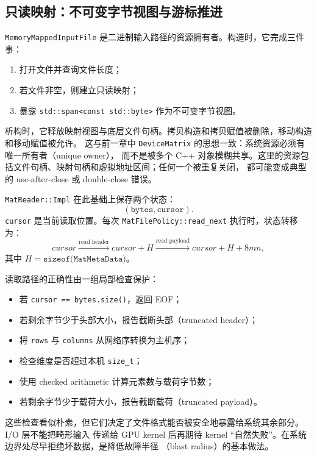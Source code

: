 \subsection{只读映射：不可变字节视图与游标推进}

\texttt{MemoryMappedInputFile} 是二进制输入路径的资源拥有者。构造时，它完成三件事：

\begin{enumerate}
    \item 打开文件并查询文件长度；
    \item 若文件非空，则建立只读映射；
    \item 暴露 \texttt{std::span<const std::byte>} 作为不可变字节视图。
\end{enumerate}

析构时，它释放映射视图与底层文件句柄。拷贝构造和拷贝赋值被删除，移动构造和移动赋值被允许。
这与前一章中 \texttt{DeviceMatrix} 的思想一致：系统资源必须有唯一所有者（unique owner），
而不是被多个 C++ 对象模糊共享。这里的资源包括文件句柄、映射句柄和虚拟地址区间；任何一个被重复关闭，
都可能变成典型的 use-after-close 或 double-close 错误。

\texttt{MatReader::Impl} 在此基础上保存两个状态：
\[
    (\texttt{bytes},\texttt{cursor}).
\]
\texttt{cursor} 是当前读取位置。每次 \texttt{MatFilePolicy::read\_next} 执行时，状态转移为：
\[
    cursor
    \xrightarrow{\text{read header}}
    cursor + H
    \xrightarrow{\text{read payload}}
    cursor + H + 8mn,
\]
其中 $H=\texttt{sizeof(MatMetaData)}$。

读取路径的正确性由一组局部检查保护：

\begin{itemize}
    \item 若 \texttt{cursor == bytes.size()}，返回 EOF；
    \item 若剩余字节少于头部大小，报告截断头部（truncated header）；
    \item 将 \texttt{rows} 与 \texttt{columns} 从网络序转换为主机序；
    \item 检查维度是否超过本机 \texttt{size\_t}；
    \item 使用 checked arithmetic 计算元素数与载荷字节数；
    \item 若剩余字节少于载荷大小，报告截断载荷（truncated payload）。
\end{itemize}

这些检查看似朴素，但它们决定了文件格式能否被安全地暴露给系统其余部分。I/O 层不能把畸形输入
传递给 GPU kernel 后再期待 kernel “自然失败”。在系统边界处尽早拒绝坏数据，是降低故障半径
（blast radius）的基本做法。

